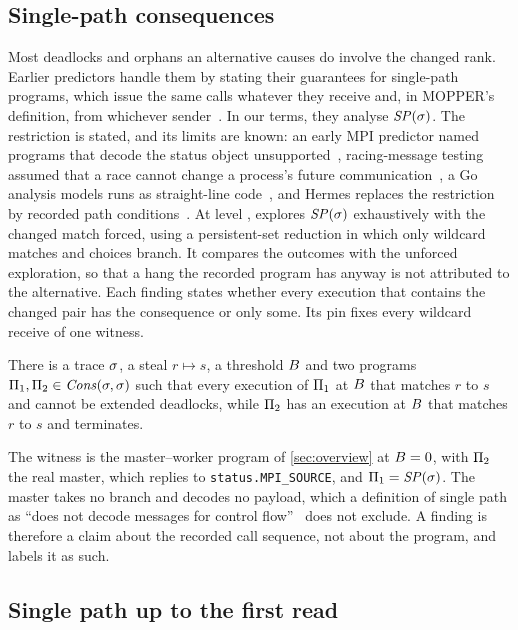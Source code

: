\subsection{Single-path consequences}

Most deadlocks and orphans an alternative causes do involve the changed rank. Earlier
predictors handle them by stating their guarantees for single-path programs, which issue
the same calls whatever they receive and, in MOPPER's definition, from whichever
sender~\citep{forejt17mopper,huang20ase}. In our terms, they analyse $\mathit{SP}(\sigma)$. The
restriction is stated, and its limits are known: an early MPI predictor named programs that
decode the status object unsupported~\citep{sharma12maaped}, racing-message testing assumed
that a race cannot change a process's future communication~\citep{kilgore97racing}, a Go
analysis models runs as straight-line code~\citep{sulzmann17hvc}, and Hermes replaces the
restriction by recorded path conditions~\citep{khanna18hermes}.
At level \LoneSP, \tool explores $\mathit{SP}(\sigma)$ exhaustively with the changed match forced,
using a persistent-set reduction in which only wildcard matches and 
choices branch. It compares the outcomes with the unforced exploration, so that a hang
the recorded program has anyway is not attributed to the alternative. Each \LoneSP
finding states whether every execution that contains the changed pair has the
consequence or only some. Its pin fixes every wildcard receive of one witness.

\begin{lemma}
\label{lem:sp}
There is a trace $\sigma$, a steal $r\mapsto s$, a threshold $B$ and two programs
$\Pi_1,\Pi_2\in\mathit{Cons}(\sigma,\sigma)$ such that every execution of $\Pi_1$ at $B$ that
matches $r$ to $s$ and cannot be extended deadlocks, while $\Pi_2$ has an execution at $B$
that matches $r$ to $s$ and terminates.
\end{lemma}

\noindent The witness is the master--worker program of \cref{sec:overview} at $B=0$, with
$\Pi_2$ the real master, which replies to \texttt{status.MPI\_SOURCE}, and
$\Pi_1=\mathit{SP}(\sigma)$. The master takes no branch and decodes no payload, which a definition
of single path as ``does not decode messages for control flow''~\citep{huang23tpds} does not
exclude. A
\LoneSP finding is therefore a claim about the recorded call sequence, not about the
program, and \tool labels it as such.

\subsection{Single path up to the first read}
\label{sec:firstread}

